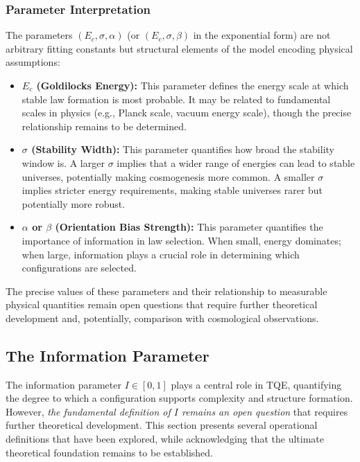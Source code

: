\documentclass[12pt,a4paper]{article}
\theoremstyle{definition}
\theoremstyle{remark}
\begin{document}
\subsubsection{Parameter Interpretation}

The parameters $(E_c, \sigma, \alpha)$ (or $(E_c, \sigma, \beta)$ in the exponential form) are not arbitrary fitting constants but structural elements of the model encoding physical assumptions:

\begin{itemize}
\item \textbf{$E_c$ (Goldilocks Energy):} This parameter defines the energy scale at which stable law formation is most probable. It may be related to fundamental scales in physics (e.g., Planck scale, vacuum energy scale), though the precise relationship remains to be determined.

\item \textbf{$\sigma$ (Stability Width):} This parameter quantifies how broad the stability window is. A larger $\sigma$ implies that a wider range of energies can lead to stable universes, potentially making cosmogenesis more common. A smaller $\sigma$ implies stricter energy requirements, making stable universes rarer but potentially more robust.

\item \textbf{$\alpha$ or $\beta$ (Orientation Bias Strength):} This parameter quantifies the importance of information in law selection. When small, energy dominates; when large, information plays a crucial role in determining which configurations are selected.
\end{itemize}

The precise values of these parameters and their relationship to measurable physical quantities remain open questions that require further theoretical development and, potentially, comparison with cosmological observations.

\subsection{The Information Parameter}

The information parameter $I \in [0,1]$ plays a central role in TQE, quantifying the degree to which a configuration supports complexity and structure formation. However, \emph{the fundamental definition of $I$ remains an open question} that requires further theoretical development. This section presents several operational definitions that have been explored, while acknowledging that the ultimate theoretical foundation remains to be established.
\end{document}
